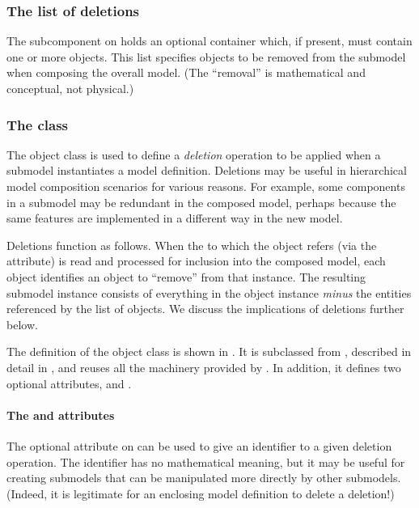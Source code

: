 \subsubsection{The list of deletions}
\label{listofdeletions}

The  subcomponent on \Submodel holds an optional
\ListOfDeletions container which, if present, must contain one or more
\Deletion objects.  This list specifies objects to be removed from the
submodel when composing the overall model.  (The ``removal'' is
mathematical and conceptual, not physical.)


\subsubsection{The  class}
\label{deletion-class}

The \Deletion object class is used to define a \emph{deletion} operation
to be applied when a submodel instantiates a model definition.
Deletions may be useful in hierarchical model composition scenarios for
various reasons.  For example, some components in a submodel may be
redundant in the composed model, perhaps because the same features are
implemented in a different way in the new model.

Deletions function as follows.  When the \Model to which the \Submodel
object refers (via the  attribute) is read and processed
for inclusion into the composed model, each \Deletion object identifies
an object to ``remove'' from that \Model instance.  The resulting
submodel instance consists of everything in the \Model object instance
\emph{minus} the entities referenced by the list of \Deletion objects.
We discuss the implications of deletions further below.

The definition of the \Deletion object class is shown in
.  It is subclassed from \SBaseRef, described in
detail in , and reuses all the machinery provided
by \SBaseRef.  In addition, it defines two optional attributes,
 and .


\paragraph{The \fixttspace{} and \fixttspace{} attributes}

The optional attribute  on \Deletion can be used to give an
identifier to a given deletion operation.  The identifier has no
mathematical meaning, but it may be useful for creating submodels that
can be manipulated more directly by other submodels.  (Indeed, it is
legitimate for an enclosing model definition to delete a deletion!)

